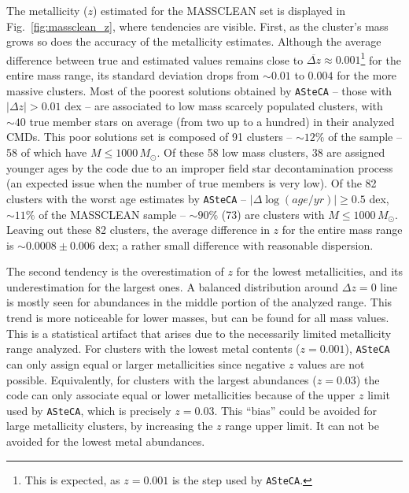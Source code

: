 \documentclass{aa}
\begin{document}
\begin{appendix}
The metallicity ($z$) estimated for the MASSCLEAN set is displayed in
Fig.~\ref{fig:massclean_z}, where tendencies are visible.
%
First, as the cluster's mass grows so does the accuracy of the
metallicity estimates. Although the average difference between true and
estimated values remains close to $\overline{\Delta z}{\approx}0.001$\footnote
{This is expected, as $z{=}0.001$ is the step used by \texttt{ASteCA}.} for the
entire mass range, its standard deviation drops from ${\sim}0.01$ to $0.004$ for
the more massive clusters.
%
%
Most of the poorest solutions obtained by \texttt{ASteCA} -- those with
$|\Delta z|{>}0.01$ dex -- are associated to low mass scarcely populated
clusters, with ${\sim}40$ true member stars on average (from two up to a
hundred) in their analyzed CMDs. This poor solutions set is composed of 91
clusters -- ${\sim}12\%$ of the sample -- 58 of which have
$M{\le}1000\,M_{\odot}$.
%
Of these 58 low mass clusters, 38 are assigned younger ages by the code due to
an improper field star decontamination process (an expected issue when the
number of true members is very low).
%
Of the 82 clusters with the worst age estimates by \texttt{ASteCA} --
$|\Delta\log(age/yr)|{\ge}0.5$ dex, ${\sim}11\%$ of the MASSCLEAN sample --
${\sim}90\%$ (73) are clusters with $M{\le}1000\,M_{\odot}$.
%
Leaving out these 82 clusters, the average difference in $z$
for the entire mass range is ${\sim}0.0008{\pm}0.006$ dex; a rather
small difference with reasonable dispersion.

The second tendency is the overestimation of $z$ for the lowest metallicities,
and its underestimation for the largest ones.
A balanced distribution around $\Delta z{=}0$ line is mostly seen for
abundances in the middle portion of the analyzed range. This trend is more
noticeable for lower masses, but can be found for all mass values.
%
This is a statistical artifact that arises due to the necessarily limited
metallicity range analyzed. For clusters with the lowest metal contents ($z
{=}0.001$), \texttt{ASteCA} can only assign equal or larger metallicities since
negative $z$ values are not possible.
Equivalently, for clusters with the largest abundances ($z{=}0.03$) the code
can only associate equal or lower metallicities because of the upper
$z$ limit used by \texttt{ASteCA}, which is precisely $z{=}0.03$.
This ``bias'' could be avoided for large metallicity clusters, by
increasing the $z$ range upper limit. It can not be avoided for the lowest metal
abundances.\\


\end{appendix}
\end{document}
